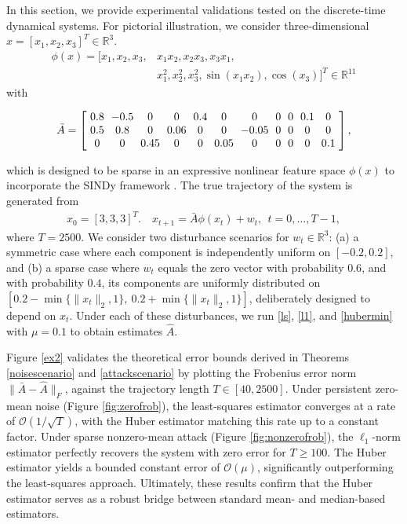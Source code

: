 \documentclass[letterpaper,10pt,conference]{ieeeconf}
\theoremstyle{plain} %
\theoremstyle{plain} %
\theoremstyle{plain} %
\theoremstyle{plain}
\begin{document}
In this section, we provide experimental validations tested on the discrete-time dynamical systems. For pictorial illustration, we consider 
three-dimensional $x=[x_1,x_2,x_3]^T\in\mathbb{R}^3$.  
\begin{align*}
  \phi(x)= [ x_1, 
        x_2, 
        x_3, 
        &x_1 x_2, 
        x_2  x_3, 
        x_3  x_1, \\&
        x_1^2, 
        x_2^2, 
        x_3^2, 
        \sin(x_1 x_2), 
        \cos(x_3)]^T\in \mathbb{R}^{11}
\end{align*}
with
\begin{footnotesize} %
\begin{equation*}\setlength{\arraycolsep}{3.2pt}
    \bar A = \left[ \begin{array}{ccccccccccc}
0.8 & -0.5 & 0 & 0 & 0.4 & 0 & 0 & 0 & 0 & 0.1 & 0 \\
0.5 & 0.8 & 0 & 0.06 & 0 & 0 & -0.05 & 0 & 0 & 0 & 0 \\
0 & 0 & 0.45 & 0 & 0 & 0.05 & 0 & 0 & 0 & 0 & 0.1
\end{array} \right],
\end{equation*}
\end{footnotesize}
which is designed to be sparse in an expressive nonlinear feature space $\phi(x)$ to incorporate the SINDy framework \cite{brunton2016discovering}.
The true trajectory of the system is generated from
\begin{align*}
    x_0 = [3,3,3]^T. \quad x_{t+1} = \bar A \phi(x_t) + w_t, ~~t=0,\dots, T-1,
\end{align*}
where $T=2500$.  We consider two  disturbance scenarios for $w_t \in \mathbb{R}^3$: (a) a symmetric case where each component is independently uniform on $[-0.2, 0.2]$, and (b) a sparse case where $w_t$ equals the zero vector with probability $0.6$, and with probability $0.4$, its components are uniformly distributed on $[0.2-\min\{\|x_t\|_2, 1\},~ 0.2+\min\{\|x_t\|_2, 1\}]$, deliberately designed to depend on $x_t$. Under each of these disturbances, we run \eqref{ls}, \eqref{l1}, and \eqref{hubermin} with $\mu=0.1$ to obtain estimates $\hat A$. 

Figure \ref{ex2} validates the theoretical error bounds derived in Theorems \ref{noisescenario} and \ref{attackscenario} by plotting the Frobenius error norm $\|\bar A - \hat A\|_F$, against the trajectory length $T \in [40, 2500]$. Under persistent zero-mean noise (Figure \ref{fig:zerofrob}), the least-squares estimator converges at a rate of $\mathcal{O}(1/\sqrt{T})$, with the Huber estimator matching this rate up to a constant factor. Under sparse nonzero-mean attack (Figure \ref{fig:nonzerofrob}), the $\ell_1$-norm estimator perfectly recovers the system with zero error for $T \ge 100$. The Huber estimator yields a bounded constant error of $\mathcal{O}(\mu)$, significantly outperforming the least-squares approach. Ultimately, these results confirm that the Huber estimator serves as a robust bridge between standard mean- and median-based estimators.
\end{document}
